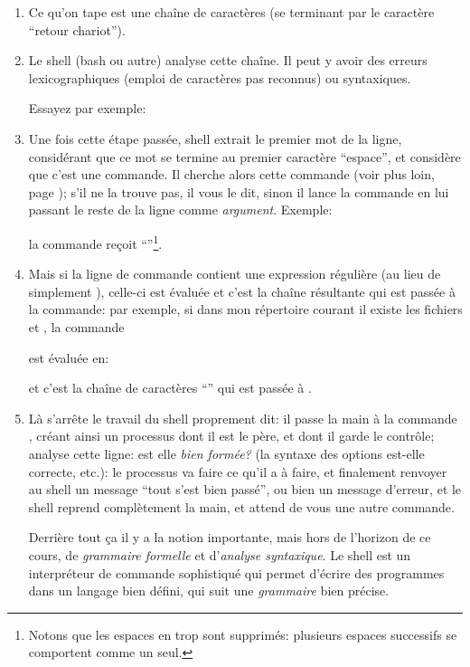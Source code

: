   \begin{enumerate}
    \item Ce qu'on tape est une chaîne de caractères (se terminant par
      le caractère ``retour chariot'').
    \item Le shell (bash ou autre) analyse cette chaîne. Il peut y
      avoir des erreurs lexicographiques (emploi de caractères pas
      reconnus) ou syntaxiques.

      Essayez par exemple:

    \item Une fois cette étape passée, shell extrait le premier mot de
      la ligne, considérant que 
      ce mot se termine au premier caractère ``espace'', et considère
      que c'est une commande. Il cherche alors cette
      commande (voir plus loin, page \pageref{path}); s'il ne
      la trouve pas, il vous le dit, sinon il lance la commande en
      lui passant le reste de la ligne comme \emph{argument}. Exemple:
      

      la 
      commande  reçoit ``''\footnote{Notons que les
        espaces en trop sont supprimés: plusieurs espaces successifs se
        comportent comme un  seul.}.
    \item Mais si la ligne de commande contient une expression
      régulière (au lieu de simplement ),
      celle-ci est évaluée et c'est la chaîne résultante qui est  passée à la
      commande: par  exemple,  si dans mon répertoire 
      courant il existe les 
      fichiers  et , la commande


      est évaluée en:


      et
      c'est la chaîne de caractères ``'' qui
      est passée à .
    \item Là s'arrête le travail du shell proprement dit: il passe la
      main à la commande  , créant ainsi un
        processus dont il est le père, et dont il garde le contrôle; 
      analyse cette ligne: 
      est elle \emph{bien formée?} (la syntaxe des options est-elle
      correcte, etc.): le processus  va faire ce qu'il a à faire, et
      finalement renvoyer au shell un message ``tout s'est bien passé'',
      ou bien un message d'erreur, et le shell reprend
      complètement la main, et attend de vous une autre commande.


      Derrière tout ça il y a la notion importante,
      mais hors de l'horizon de ce cours, de \emph{grammaire formelle}
      et d'\emph{analyse syntaxique}. Le shell est un interpréteur de
      commande sophistiqué qui permet d'écrire des programmes dans un
      langage bien défini, qui suit une \emph{grammaire} bien précise.
   \end{enumerate} 
